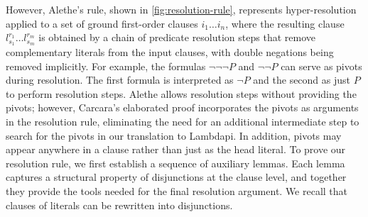 However, Alethe's  rule, shown in \cref{fig:resolution-rule}, represents hyper-resolution applied to a set of ground first-order clauses $i_1 \dots i_n$,
where the resulting clause $l_{s_1}^{r_1} \dots l_{s_m}^{r_m}$ is obtained by a chain of predicate resolution steps that remove complementary literals from the input clauses, with double negations being removed implicitly.
For example, the formulas $\neg \neg \neg P$ and $\neg \neg P$ can serve as pivots during resolution.
The first formula is interpreted as $\neg P$ and the second as just $P$ to perform resolution steps.
Alethe allows resolution steps without providing the pivots; however, Carcara's elaborated proof incorporates the pivots as arguments in the resolution rule, eliminating the need for an additional intermediate step to search for the pivots in our translation to Lambdapi.
In addition, pivots may appear anywhere in a clause rather than just as the head literal.
To prove our resolution rule, we first establish a sequence of auxiliary lemmas.
Each lemma captures a structural property of disjunctions at the clause level,
and together they provide the tools needed for the final resolution argument.
We recall that clauses of literals can be rewritten into disjunctions.

